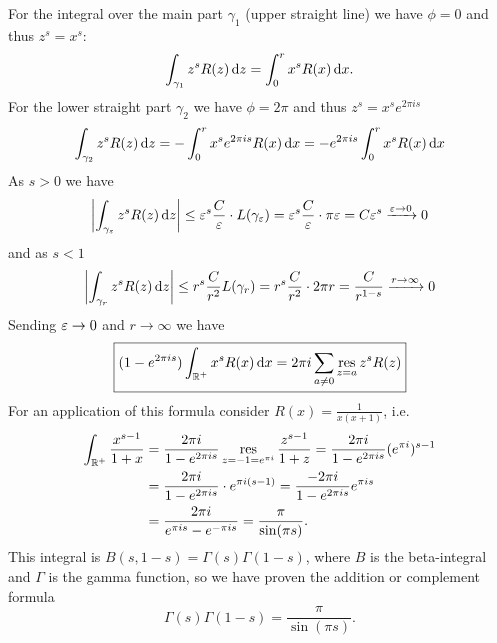 \documentclass[a4paper,english]{article}
\begin{document}
\begin{example}
    For the integral over the main part $\gamma_1$ (upper straight line) we have $\phi = 0$ and thus $z^s = x^s$:
    \begin{equation*}
        \int_{\gamma_1} z^s R(z) \mathop{}\!\mathrm{d}{z}
        = \int_{0}^{r} x^s R(x) \mathop{}\!\mathrm{d}{x}.
    \end{equation*}
    For the lower straight part $\gamma_2$ we have $\phi = 2 \pi$ and thus $z^s = x^s e^{2 \pi i s}$
    \begin{equation*}
        \int_{\gamma_2} z^s R(z) \mathop{}\!\mathrm{d}{z}
        = - \int_{0}^{r} x^s e^{2 \pi i s} R(x) \mathop{}\!\mathrm{d}{x}
        = - e^{2 \pi i s} \int_{0}^{r} x^s R(x) \mathop{}\!\mathrm{d}{x}
    \end{equation*}
    As $s > 0$ we have
    \begin{equation*}
        \left| \int_{\gamma_{\varepsilon}} z^s R(z) \mathop{}\!\mathrm{d}{z} \right| 
        \le \varepsilon^s \frac{C}{\varepsilon} \cdot L(\gamma_{\varepsilon})
        = \varepsilon^s \frac{C}{\varepsilon} \cdot \pi \varepsilon
        = C \varepsilon^s
        \xrightarrow{\varepsilon \to 0} 0
    \end{equation*}
    and as $s < 1$
    \begin{equation*}
        \left| \int_{\gamma_{r}} z^s R(z) \mathop{}\!\mathrm{d}{z} \right| 
        \le r^s \frac{C}{r^2} L(\gamma_r)
        = r^s \frac{C}{r^2} \cdot 2 \pi r
        = \frac{C}{r^{1 - s}}
        \xrightarrow{r \to \infty} 0
    \end{equation*}
    Sending $\varepsilon \to 0$ and $r \to \infty$ we have
    \begin{equation*}
        \boxed{
            (1 - e^{2 \pi i s}) \int_{\operatorname{\mathbb{R}}^+} x^s R(x) \mathop{}\!\mathrm{d}{x}
            = 2 \pi i \sum_{a \ne 0} \operatorname*{res}_{z = a} z^s R(z)
        }
    \end{equation*}
    For an application of this formula consider $R(x) = \frac{1}{x(x + 1)}$, i.e.
    \begin{align*}
        \int_{\operatorname{\mathbb{R}}^+} \frac{x^{s - 1}}{1 + x}
        & = \frac{ 2 \pi i }{1 - e^{2 \pi i s}} \operatorname*{res}_{z = - 1 = e^{\pi i}} \frac{z^{s - 1}}{1 + z}
        = \frac{2 \pi i}{1 - e^{2 \pi i s}} (e^{\pi i})^{s - 1} \\
        & = \frac{2 \pi i}{1 - e^{2 \pi i s}} \cdot e^{\pi i (s - 1)}
        = \frac{-2 \pi i}{1 - e^{2 \pi i s}} e^{\pi i s} \\
        & = \frac{2 \pi i}{e^{\pi i s} - e^{- \pi i s}}
        = \frac{\pi}{\sin(\pi s)}.
    \end{align*}
    This integral is $B(s, 1 - s) = \Gamma(s) \Gamma(1 - s)$, where $B$ is the beta-integral and $\Gamma$ is the gamma function, so we have proven the addition or complement formula
    \begin{equation} \label{eq:complement}
        \Gamma(s) \Gamma(1 - s)
        = \frac{\pi}{\sin(\pi s)}.
    \end{equation}
\end{example}
\end{document}
